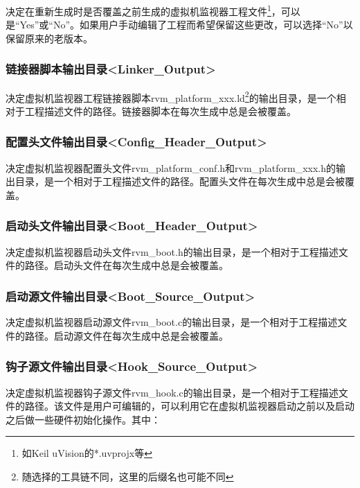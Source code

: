 决定在重新生成时是否覆盖之前生成的虚拟机监视器工程文件\footnote{如Keil uVision的*.uvprojx等}，可以是``Yes''或``No''。如果用户手动编辑了工程而希望保留这些更改，可以选择``No''以保留原来的老版本。

\subsubsection{链接器脚本输出目录<Linker\_Output>{}}\label{subsubsec:5-3-13-17}

决定虚拟机监视器工程链接器脚本rvm\_platform\_xxx.ld\footnote{随选择的工具链不同，这里的后缀名也可能不同}的输出目录，是一个相对于工程描述文件的路径。链接器脚本在每次生成中总是会被覆盖。

\subsubsection{配置头文件输出目录<Config\_Header\_Output>{}}\label{subsubsec:5-3-13-18}

决定虚拟机监视器配置头文件rvm\_platform\_conf.h和rvm\_platform\_xxx.h的输出目录，是一个相对于工程描述文件的路径。配置头文件在每次生成中总是会被覆盖。

\subsubsection{启动头文件输出目录<Boot\_Header\_Output>{}}\label{subsubsec:5-3-13-19}

决定虚拟机监视器启动头文件rvm\_boot.h的输出目录，是一个相对于工程描述文件的路径。启动头文件在每次生成中总是会被覆盖。

\subsubsection{启动源文件输出目录<Boot\_Source\_Output>{}}\label{subsubsec:5-3-13-20}

决定虚拟机监视器启动源文件rvm\_boot.c的输出目录，是一个相对于工程描述文件的路径。启动源文件在每次生成中总是会被覆盖。

\subsubsection{钩子源文件输出目录<Hook\_Source\_Output>{}}\label{subsubsec:5-3-13-21}

决定虚拟机监视器钩子源文件rvm\_hook.c的输出目录，是一个相对于工程描述文件的路径。该文件是用户可编辑的，可以利用它在虚拟机监视器启动之前以及启动之后做一些硬件初始化操作。其中：


